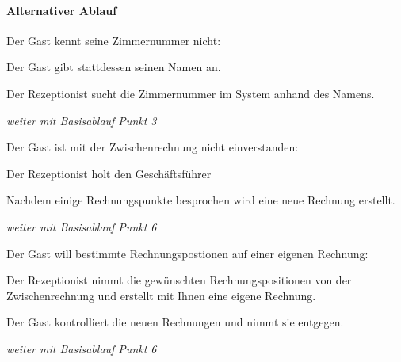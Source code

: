 \paragraph{Alternativer Ablauf}
\begin{longenum}
	\item
	\begin{longenum}
		\item Der \Gls{Gast} kennt seine \Gls{Zimmernummer} nicht:
		\begin{longenum}
			\item Der \Gls{Gast} gibt stattdessen seinen Namen an.
			\item Der \Gls{Rezeptionist} sucht die \Gls{Zimmernummer} im System anhand des	Namens.
			\item \emph{weiter mit Basisablauf Punkt 3}
		\end{longenum}
	\end{longenum}
	\item
	\item
	\item
	\item
	\begin{longenum}
		\item Der \Gls{Gast} ist mit der \Gls{Zwischenrechnung} nicht einverstanden:
		\begin{longenum}
			\item Der \Gls{Rezeptionist} holt den Geschäftsführer
			\item Nachdem einige Rechnungspunkte besprochen wird eine neue Rechnung
			erstellt.
			\item \emph{weiter mit Basisablauf Punkt 6}
		\end{longenum}
	\end{longenum}
	\begin{longenum}
	\item Der \Gls{Gast} will bestimmte Rechnungspostionen auf einer eigenen
	\Gls{Rechnung}:
		\begin{longenum}
			\item Der \Gls{Rezeptionist} nimmt die gewünschten Rechnungspositionen von
			der \Gls{Zwischenrechnung} und erstellt mit Ihnen eine eigene \Gls{Rechnung}.
			\item Der \Gls{Gast} kontrolliert die neuen \Gls{Rechnung}en und nimmt sie
			entgegen.
			\item \emph{weiter mit Basisablauf Punkt 6}
		\end{longenum}
	\end{longenum}
	\begin{longenum}

\end{longenum}
\end{longenum}
